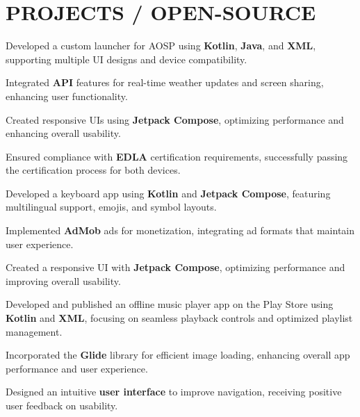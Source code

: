 \documentclass[bold]{deedy-resume-openfont}
\begin{document}
\begin{minipage}[t]{0.66\textwidth}

\section*{PROJECTS / OPEN-SOURCE}

\begin{tightemize}
    \item Developed a custom launcher for AOSP using \textbf{Kotlin}, \textbf{Java}, and \textbf{XML}, supporting multiple UI designs and device compatibility.
    \item Integrated \textbf{API} features for real-time weather updates and screen sharing, enhancing user functionality.
    \item Created responsive UIs using \textbf{Jetpack Compose}, optimizing performance and enhancing overall usability.
    \item Ensured compliance with \textbf{EDLA} certification requirements, successfully passing the certification process for both devices.
\end{tightemize}
\sectionsep


\begin{tightemize}
    \item Developed a keyboard app using \textbf{Kotlin} and \textbf{Jetpack Compose}, featuring multilingual support, emojis, and symbol layouts.
    \item Implemented \textbf{AdMob} ads for monetization, integrating ad formats that maintain user experience.
    \item Created a responsive UI with \textbf{Jetpack Compose}, optimizing performance and improving overall usability.
\end{tightemize}
\sectionsep

\begin{tightemize}
    \item Developed and published an offline music player app on the Play Store using \textbf{Kotlin} and \textbf{XML}, focusing on seamless playback controls and optimized playlist management.
    \item Incorporated the \textbf{Glide} library for efficient image loading, enhancing overall app performance and user experience.
    \item Designed an intuitive \textbf{user interface} to improve navigation, receiving positive user feedback on usability.
\end{tightemize}
\sectionsep


\end{minipage} 
\end{document}
